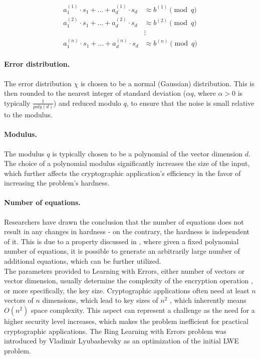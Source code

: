 \documentclass[11pt,
  titlepage=false,
  abstract=on,
]{scrreprt}
\begin{document}
\[
  \begin{aligned}
a_1^{(1)} \cdot s_1 + \dots + a_d^{(1)} \cdot s_d &\approx b^{(1)} \pmod{q} \\
a_1^{(2)} \cdot s_1 + \dots + a_d^{(2)} \cdot s_d &\approx b^{(2)} \pmod{q} \\
&\vdots \\
a_1^{(n)} \cdot s_1 + \dots + a_d^{(n)} \cdot s_d &\approx b^{(n)} \pmod{q}
\label{The Learning with Errors Problem}
\end{aligned}
\]

\paragraph{Error distribution.}
The error distribution $\chi$ is chosen to be a normal (Gaussian) distribution. This is then rounded to the nearest integer of standard deviation ($\alpha q$, where $\alpha > 0$ is typically $\frac{1}{poly(d)}$)
and reduced modulo $q$, to ensure that the noise is small relative to the modulus.

\paragraph{Modulus.} The modulus $q$ is typically chosen to be a polynomial of the vector dimension $d$. The choice of a polynomial modulus significantly increases the size of the input, which further affects
the cryptographic application's efficiency in the favor of increasing the problem's hardness.

\paragraph{Number of equations.} Researchers have drawn the conclusion that the number of equations does not result in any changes in hardness - on the contrary, the hardness is independent of it.
This is due to a property discussed in \cite{regev2010learning}, where given a fixed polynomial number of equations,  it is possible to generate an arbitrarily large number of additional equations, 
which can be further utilized.\\

The parameters provided to Learning with Errors, either number of vectors or vector dimension, usually determine the complexity of the encryption operation \cite{micciancio2013hardness}, or more specifically, the key size. 
Cryptographic applications often need at least  $n$ vectors of $n$ dimensions, which lead to key sizes of $n^2$ \cite{regev2010learning}, which inherently means $O(n^{2})$ space complexity. This aspect can represent a challenge as the need for a higher 
security level increases, which makes the problem inefficient for practical cryptographic applications.
The Ring Learning with Errors problem \cite{lyubashevsky2010ideal} was introduced by Vladimir Lyubashevsky as an optimization of the initial LWE problem.
\end{document}
